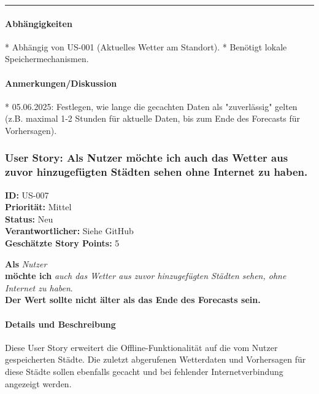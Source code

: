 \documentclass{article}
\begin{document}
\vspace{0.5em}
\hrule

\paragraph{Abhängigkeiten}
* Abhängig von US-001 (Aktuelles Wetter am Standort).
* Benötigt lokale Speichermechanismen.

\paragraph{Anmerkungen/Diskussion}
* 05.06.2025: Festlegen, wie lange die gecachten Daten als "zuverlässig" gelten (z.B. maximal 1-2 Stunden für aktuelle Daten, bis zum Ende des Forecasts für Vorhersagen).

\clearpage

\subsubsection{User Story: Als Nutzer möchte ich auch das Wetter aus zuvor hinzugefügten Städten sehen ohne Internet zu haben.}
\textcolor{storyblue}{\textbf{ID:}} US-007 \\
\textcolor{storyblue}{\textbf{Priorität:}} Mittel \\
\textcolor{storyblue}{\textbf{Status:}} Neu \\
\textcolor{storyblue}{\textbf{Verantwortlicher:}} Siehe GitHub \\
\textcolor{storyblue}{\textbf{Geschätzte Story Points:}} 5

\vspace{0.5em}

\textcolor{storygreen}{\textbf{Als}} \textit{Nutzer} \\
\textcolor{storygreen}{\textbf{möchte ich}} \textit{auch das Wetter aus zuvor hinzugefügten Städten sehen, ohne Internet zu haben}. \\
\textcolor{storygreen}{\textbf{Der Wert sollte nicht älter als das Ende des Forecasts sein.}}

\vspace{1em}

\paragraph{Details und Beschreibung}
Diese User Story erweitert die Offline-Funktionalität auf die vom Nutzer gespeicherten Städte. Die zuletzt abgerufenen Wetterdaten und Vorhersagen für diese Städte sollen ebenfalls gecacht und bei fehlender Internetverbindung angezeigt werden.
\end{document}
